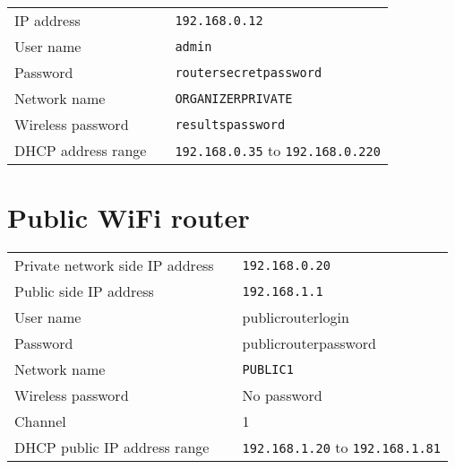 \documentclass[a4paper]{ffco-rapport}
\begin{document}
\begin{tabular}{lp{6cm}l}
	IP address & \hrulefill &\color{gray}\footnotesize\texttt{192.168.0.12}\\
	User name & \hrulefill &\color{gray}\footnotesize\texttt{admin}\\
	Password & \hrulefill &\color{gray}\footnotesize\texttt{routersecretpassword}\\
	Network name & \hrulefill &\color{gray}\footnotesize\texttt{ORGANIZERPRIVATE}\\
	Wireless password & \hrulefill &\color{gray}\footnotesize\texttt{resultspassword}\\
	DHCP address range & \hrulefill &\color{gray}\footnotesize\texttt{192.168.0.35} to \texttt{192.168.0.220}\\
\end{tabular}

\section*{Public WiFi router}

\begin{tabular}{lp{6cm}l}
	Private network side IP address & \hrulefill &\color{gray}\footnotesize\texttt{192.168.0.20}\\
	Public side IP address & \hrulefill &\color{gray}\footnotesize\texttt{192.168.1.1}\\
	User name & \hrulefill &\color{gray}\footnotesize publicrouterlogin\\
	Password & \hrulefill &\color{gray}\footnotesize publicrouterpassword\\
	Network name & \hrulefill &\color{gray}\footnotesize\texttt{PUBLIC1}\\
	Wireless password & \hrulefill &\color{gray}\footnotesize No password\\ 
	Channel & \hrulefill &\color{gray}\footnotesize1\\
	DHCP public IP address range & \hrulefill &\color{gray}\footnotesize\texttt{192.168.1.20} to \texttt{192.168.1.81}\\
\end{tabular}

	
\end{document}
